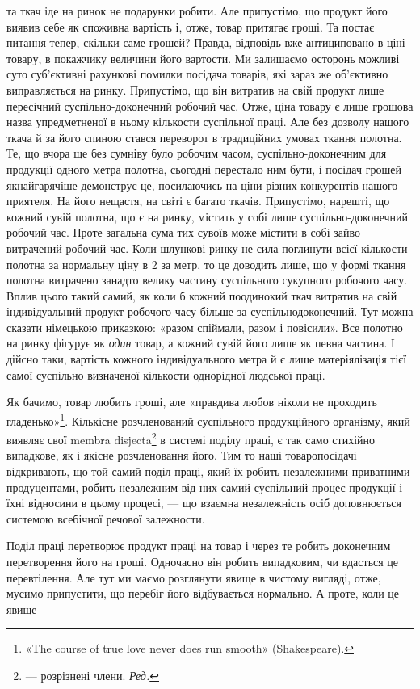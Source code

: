 \parcont{}  %
та ткач іде на ринок не подарунки робити. Але припустімо, що
продукт його виявив себе як споживна вартість і, отже, товар
притягає гроші. Та постає питання тепер, скільки саме грошей?
Правда, відповідь вже антициповано в ціні товару, в покажчику
величини його вартости. Ми залишаємо осторонь можливі суто
суб’єктивні рахункові помилки посідача товарів, які зараз же
об’єктивно виправляється на ринку. Припустімо, що він витратив
на свій продукт лише пересічний суспільно-доконечний
робочий час. Отже, ціна товару є лише грошова назва упредметненої
в ньому кількости суспільної праці. Але без дозволу нашого
ткача й за його спиною стався переворот в традиційних умовах
ткання полотна. Те, що вчора ще без сумніву було робочим часом,
суспільно-доконечним для продукції одного метра полотна,
сьогодні перестало ним бути, і посідач грошей якнайгарячіше
демонструє це, посилаючись на ціни різних конкурентів нашого
приятеля. На його нещастя, на світі є багато ткачів. Припустімо,
нарешті, що кожний сувій полотна, що є на ринку, містить у
собі лише суспільно-доконечний робочий час. Проте загальна
сума тих сувоїв може містити в собі зайво витрачений робочий
час. Коли шлункові ринку не сила поглинути всієї кількости
полотна за нормальну ціну в 2 за метр, то це доводить
лише, що у формі ткання полотна витрачено занадто велику
частину суспільного сукупного робочого часу. Вплив цього
такий самий, як коли б кожний поодинокий ткач витратив на
свій індивідуальний продукт робочого часу більше за суспільнодоконечний.
Тут можна сказати німецькою приказкою: «разом
спіймали, разом і повісили». Все полотно на ринку фігурує як
\emph{один} товар, а кожний сувій його лише як певна частина. І дійсно
таки, вартість кожного індивідуального метра й є лише матеріялізація
тієї самої суспільно визначеної кількости однорідної
людської праці.

Як бачимо, товар любить гроші, але «правдива любов ніколи
не проходить гладенько»\footnote*{
«The course of true love never does run smooth» (Shakespeare).
}. Кількісне розчленований суспільного
продукційного організму, який виявляє свої membra disjecta\footnote*{
— розрізнені члени. \emph{Ред.}
}
в системі поділу праці, є так само стихійно випадкове, як і якісне
розчленовання його. Тим то наші товаропосідачі відкривають, що
той самий поділ праці, який їх робить незалежними приватними
продуцентами, робить незалежним від них самий суспільний процес
продукції і їхні відносини в цьому процесі, — що взаємна
незалежність осіб доповнюється системою всебічної речової залежности.

Поділ праці перетворює продукт праці на товар і через те
робить доконечним перетворення його на гроші. Одночасно він
робить випадковим, чи вдасться це перевтілення. Але тут ми маємо
розглянути явище в чистому вигляді, отже, мусимо припустити,
що перебіг його відбувається нормально. А проте, коли це явище
\parbreak{}  %
